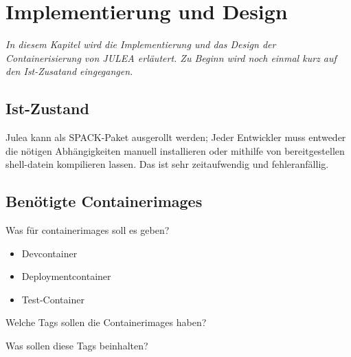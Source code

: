 \chapter{Implementierung und Design}
\label{cha:implementation_design}

\textit{In diesem Kapitel wird die Implementierung und das Design der Containerisierung von JULEA erläutert. Zu Beginn wird noch einmal kurz auf den Ist-Zusatand eingegangen.}

\section{Ist-Zustand}

Julea kann als SPACK-Paket ausgerollt werden; Jeder Entwickler muss entweder die nötigen Abhängigkeiten manuell installieren oder mithilfe von bereitgestellen shell-datein kompilieren lassen. Das ist sehr zeitaufwendig und fehleranfällig.

\section{Benötigte Containerimages}

Was für containerimages soll es geben?

\begin{itemize}
    \item Devcontainer
    \item Deploymentcontainer
    \item Test-Container
\end{itemize}

Welche Tags sollen die Containerimages haben?

Was sollen diese Tags beinhalten?

